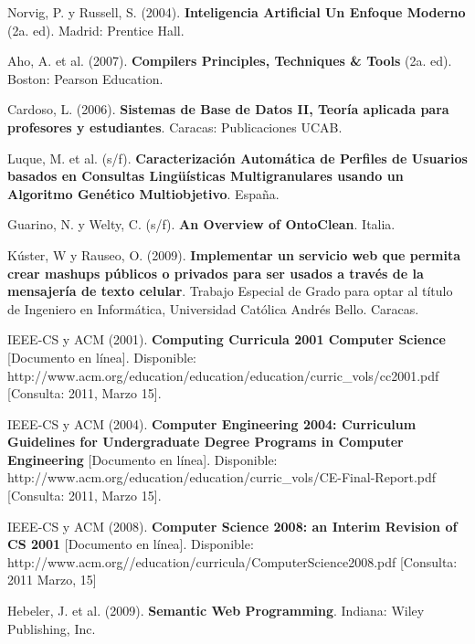 \begin{thebibliography}{20}
     Norvig, P. y Russell, S. (2004). \textbf{Inteligencia Artificial Un Enfoque Moderno} (2a. ed). Madrid: Prentice Hall.

     Aho, A. et al. (2007). \textbf{Compilers Principles, Techniques & Tools} (2a. ed). Boston: Pearson Education.

     Cardoso, L. (2006). \textbf{Sistemas de Base de Datos II, Teoría aplicada para profesores y estudiantes}. Caracas: Publicaciones UCAB.

     Luque, M. et al. (s/f). \textbf{Caracterización Automática de Perfiles de Usuarios basados en Consultas Lingüísticas Multigranulares usando un Algoritmo Genético Multiobjetivo}. España.

 Guarino, N. y Welty, C. (s/f). \textbf{An Overview of OntoClean}. Italia.

 Kúster, W y Rauseo, O. (2009). \textbf{Implementar un servicio web que permita crear mashups públicos o privados para ser usados a través de la mensajería de texto celular}. Trabajo Especial de Grado para optar al título de Ingeniero en Informática, Universidad Católica Andrés Bello. Caracas.

 IEEE-CS y ACM (2001). \textbf{Computing Curricula 2001 Computer Science} [Documento en línea]. Disponible: http://www.acm.org/education/education/education/curric\_vols/cc2001.pdf [Consulta: 2011, Marzo 15].

 IEEE-CS y ACM (2004). \textbf{Computer Engineering 2004: Curriculum Guidelines for Undergraduate Degree Programs in Computer Engineering} [Documento en línea]. Disponible: http://www.acm.org/education/education/curric\_vols/CE-Final-Report.pdf [Consulta: 2011, Marzo 15].

 IEEE-CS y ACM (2008). \textbf{Computer Science 2008: an Interim Revision of CS 2001} [Documento en línea]. Disponible: http://www.acm.org//education/curricula/ComputerScience2008.pdf [Consulta: 2011 Marzo, 15]

 Hebeler, J. et al. (2009). \textbf{Semantic Web Programming}. Indiana: Wiley Publishing, Inc.

\end{thebibliography}
